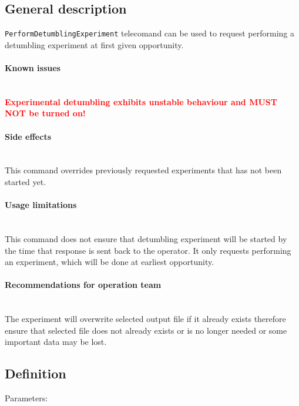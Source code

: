 

\subsection{General description}
\texttt{PerformDetumblingExperiment} telecomand can be used to request performing a detumbling 
experiment at first given opportunity.

\paragraph{Known issues} \mbox{} \\
\textcolor{red}{\bfseries{Experimental detumbling exhibits unstable behaviour and MUST NOT be turned on!}}

\paragraph{Side effects} \mbox{} \\
This command overrides previously requested experiments that has not been started yet. 

\paragraph{Usage limitations} \mbox{} \\
This command does not ensure that detumbling experiment will be started by the time that 
response is sent back to the operator. It only requests performing an experiment, which 
will be done at earliest opportunity.

\paragraph{Recommendations for operation team} \mbox{} \\
The experiment will overwrite selected output file if it already exists therefore ensure 
that selected file does not already exists or is no longer needed or some important data
may be lost.

\subsection{Definition}

Parameters:

